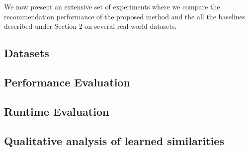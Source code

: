 We now present an extensive set of experiments
where we compare the recommendation performance of the proposed method and the all the baselines described under Section 2 on several real-world datasets.
\subsection{Datasets}


\subsection{Performance Evaluation}


\subsection{Runtime Evaluation}
\label{section:scalability}


\subsection{Qualitative analysis of learned similarities}

